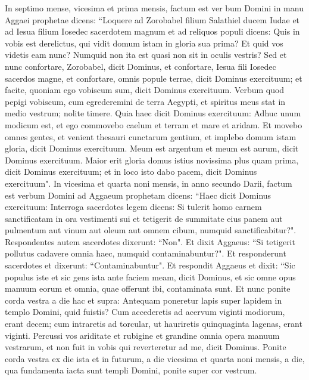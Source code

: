 \begin{biblechapter}  
\verse In septimo mense, vicesima et prima mensis, factum est ver bum Domini in manu Aggaei prophetae dicens: 
\verse “Loquere ad Zorobabel filium Salathiel ducem Iudae et ad Iesua filium Iosedec sacerdotem magnum et ad reliquos populi dicens: 
\verse Quis in vobis est derelictus, qui vidit domum istam in gloria sua prima? Et quid vos videtis eam nunc? Numquid non ita est quasi non sit in oculis vestris? 
\verse Sed et nunc confortare, Zorobabel, dicit Dominus, et confortare, Iesua fili Iosedec sacerdos magne, et confortare, omnis popule terrae, dicit Dominus exercituum; et facite, quoniam ego vobiscum sum, dicit Dominus exercituum. 
\verse Verbum quod pepigi vobiscum, cum egrederemini de terra Aegypti, et spiritus meus stat in medio vestrum; nolite timere. 
\verse Quia haec dicit Dominus exercituum: Adhuc unum modicum est, et ego commovebo caelum et terram et mare et aridam.  
\verse Et movebo omnes gentes, et venient thesauri cunctarum gentium, et implebo domum istam gloria, dicit Dominus exercituum. 
\verse Meum est argentum et meum est aurum, dicit Dominus exercituum. 
\verse Maior erit gloria domus istius novissima plus quam prima, dicit Dominus exercituum; et in loco isto dabo pacem, dicit Dominus exercituum". 
\verse In vicesima et quarta noni mensis, in anno secundo Darii, factum est verbum Domini ad Aggaeum prophetam dicens: 
\verse “Haec dicit Dominus exercituum: Interroga sacerdotes legem dicens: 
\verse Si tulerit homo carnem sanctificatam in ora vestimenti sui et tetigerit de summitate eius panem aut pulmentum aut vinum aut oleum aut omnem cibum, numquid sanctificabitur?". Respondentes autem sacerdotes dixerunt: “Non". 
\verse Et dixit Aggaeus: “Si tetigerit pollutus cadavere omnia haec, numquid contaminabuntur?". Et responderunt sacerdotes et dixerunt: “Contaminabuntur". 
\verse Et respondit Aggaeus et dixit: “Sic populus iste et sic gens ista ante faciem meam, dicit Dominus, et sic omne opus manuum eorum et omnia, quae offerunt ibi, contaminata sunt. 
\verse Et nunc ponite corda vestra a die hac et supra: Antequam poneretur lapis super lapidem in templo Domini, 
\verse quid fuistis? Cum accederetis ad acervum viginti modiorum, erant decem; cum intraretis ad torcular, ut hauriretis quinquaginta lagenas, erant viginti. 
\verse Percussi vos ariditate et rubigine et grandine omnia opera manuum vestrarum, et non fuit in vobis qui reverteretur ad me, dicit Dominus. 
\verse Ponite corda vestra ex die ista et in futurum, a die vicesima et quarta noni mensis, a die, qua fundamenta iacta sunt templi Domini, ponite super cor vestrum. 

\end{biblechapter}
